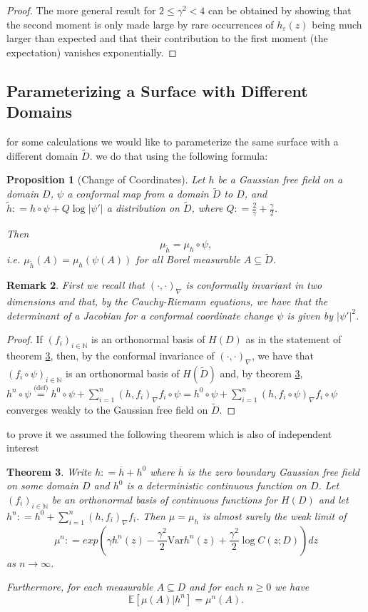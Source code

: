\documentclass[11pt,reqno]{amsart}
\numberwithin{equation}{section}
\newtheorem{thm}{Theorem}[section]
\newtheorem{pro}[thm]{Proposition}
\newtheorem{rem}[thm]{Remark}
\newcommand{\eqbydef}{\mathrel{\stackrel{\text{(def)}}{=}}}
\newcommand{\deq}{\mathrel{\mathop:}=}
\newcommand{\eps}{\varepsilon}
\begin{document}
\begin{proof}
	The more general result for $2\leq\gamma^2<4$ can be obtained by showing that the second moment is only made large by rare occurrences of $h_\eps(z)$ being much larger than expected and that their contribution to the first moment (the expectation) vanishes exponentially.
\end{proof}

\subsection{Parameterizing a Surface with Different Domains}
for some calculations we would like to parameterize the same surface with a different domain $\tilde D$. we do that using the following formula:

\begin{pro}[Change of Coordinates]
	Let $h$ be a Gaussian free field on a domain $D$, $\psi$ a conformal map from a domain $\tilde D$ to $D$, and $\tilde h\deq h\circ\psi+Q\log|\psi'|$ a distribution on $\tilde D$, where $Q\deq \frac{2}{\gamma}+\frac{\gamma}{2}$.
	
	Then $$\mu_{\tilde h}=\mu_h\circ\psi,$$
	i.e. $\mu_{\tilde h}(A)=\mu_h(\psi(A))$ for all Borel measurable $A\subseteq \tilde D$.
\end{pro}
\begin{rem}
	First we recall that $(\cdot,\cdot)_\nabla$ is conformally invariant in two dimensions and that, by the Cauchy-Riemann equations, we have that the determinant of a Jacobian for a conformal coordinate change $\psi$ is given by $|\psi'|^2$.
\end{rem}
\begin{proof}
	If $(f_i)_{i\in\mathbb N}$ is an orthonormal basis of $H(D)$ as in the statement of theorem \ref{thm:approximationofhwithhn}, then, by the conformal invariance of $(\cdot,\cdot)_\nabla$, we have that $(f_i\circ\psi)_{i\in\mathbb N}$ is an orthonormal basis of $H(\tilde D)$ and, by theorem \ref{thm:approximationofhwithhn}, $h^n\circ \psi \eqbydef h^0\circ\psi+\sum^n_{i=1}(h,f_i)_\nabla f_i\circ\psi = h^0\circ\psi+\sum^n_{i=1}(h,f_i\circ\psi)_\nabla f_i\circ\psi$ converges weakly to the Gaussian free field on $\tilde D$. 
\end{proof}

to prove it we assumed the following theorem which is also of independent interest

\begin{thm}\label{thm:approximationofhwithhn}
	Write $h\deq \overline h+h^0$ where $\overline h$ is the zero boundary Gaussian free field on some domain $D$ and $h^0$ is a deterministic continuous function on $D$. Let $(f_i)_{i\in\mathbb N}$ be an orthonormal basis of continuous functions for $H(D)$ and let $h^n\deq h^0+\sum_{i=1}^n (h,f_i)_\nabla f_i$. Then $\mu=\mu_h$ is almost surely the weak limit of $$\mu^n\deq exp\left(\gamma h^n(z)-\frac{\gamma^2}{2}\text{Var}h^n(z)+\frac{\gamma^2}{2}\log C(z;D) \right)dz$$
	as $n\rightarrow\infty$.
	
	Furthermore, for each measurable $A\subseteq D$ and for each $n\geq 0$ we have $$\mathbb E[\mu(A)|h^n]=\mu^n(A).$$
\end{thm}
\end{document}
